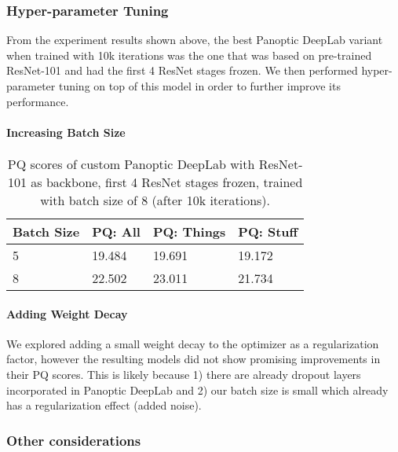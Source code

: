 \documentclass[10pt,twocolumn,letterpaper]{article}
\begin{document}
\subsubsection{Hyper-parameter Tuning}

From the experiment results shown above, the best Panoptic DeepLab variant when trained with 10k iterations was the one that was based on pre-trained ResNet-101 and had the first 4 ResNet stages frozen. We then performed hyper-parameter tuning on top of this model in order to further improve its performance. 

\paragraph{Increasing Batch Size}
\begin{table}[htbp]\centering
\begin{tabular}{ || m{5em} | m{4em} | m{5em} | m{4em} ||} 
  \hline
  Batch Size & PQ: All & PQ: Things & PQ: Stuff \\
  \hline
  5 & 19.484 & 19.691 & 19.172 \\ 
  \hline
  8 & 22.502 & 23.011 & 21.734 \\ 
  \hline
\end{tabular}
\caption{PQ scores of custom Panoptic DeepLab with ResNet-101 as backbone, first 4 ResNet stages frozen, trained with batch size of 8 (after 10k iterations).}
\label{tab:deeplab_batch_size_8}
\end{table}

\paragraph{Adding Weight Decay}
We explored adding a small weight decay to the optimizer as a regularization factor, however the resulting models did not show promising improvements in their PQ scores. This is likely because 1) there are already dropout layers incorporated in Panoptic DeepLab and 2) our batch size is small which already has a regularization effect (added noise).


\subsubsection{Other considerations}
\end{document}
